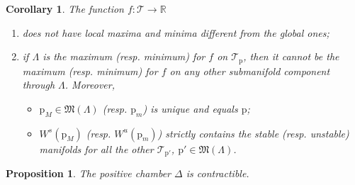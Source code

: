 \documentclass[10pt,a4paper]{amsart}
\newtheorem{corollary}{Corollary}
\newtheorem{proposition}{Proposition}
\newcommand{\R}{\mathbb{R}}
\newcommand{\cT}{\mathcal{T}}
\newcommand{\p}{\mathrm{p}}
\begin{document}
\begin{corollary}\label{cor:morse-ordering} The function $f:\cT\to \R$
\begin{enumerate}
 \item does not have local maxima and minima different from the global ones;
 \item if $\Lambda$ is the maximum (resp. minimum) for $f$ on $\cT_{\p}$, then it cannot be the maximum (resp.
 minimum) for $f$ on any other submanifold component through $\Lambda$. Moreover,
 \begin{itemize}
  \item $\p_M\in \mathfrak{M}(\Lambda)$ (resp. $\p_m$) is unique and equals $\p$;
  \item $W^s(\p_M)$ (resp. $W^u(\p_m)$) strictly contains the  stable (resp. unstable) manifolds for all the other $\cT_{\p'}$, $\p'\in \mathfrak{M}(\Lambda)$.
 \end{itemize}
\end{enumerate}
\end{corollary}

\begin{proposition}\label{pro:contractible} The positive chamber $\Delta$ is contractible.
 \end{proposition}
\end{document}
